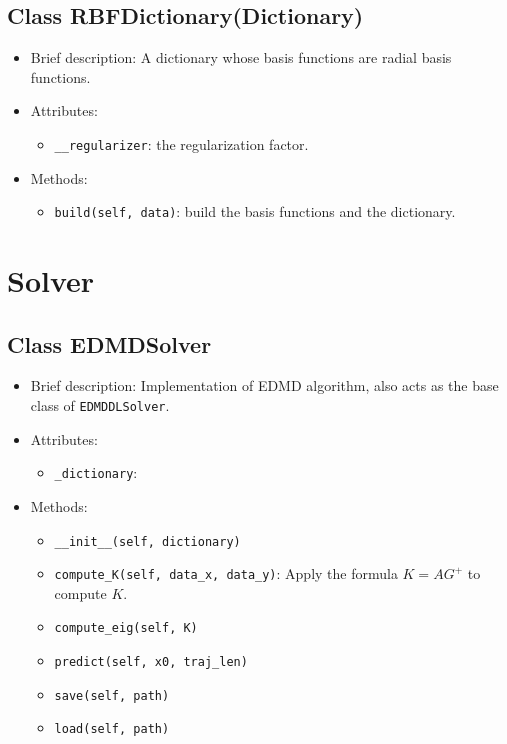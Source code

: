 \subsection{Class RBFDictionary(Dictionary)}

\begin{itemize}
\item Brief description: A dictionary whose basis functions are radial basis functions.
\item Attributes:
  \begin{itemize}
  \item \lstinline|__regularizer|: the regularization factor.
  \end{itemize}
\item Methods:
  \begin{itemize}
  \item \lstinline|build(self, data)|: build the basis functions and the dictionary.
  \end{itemize}
\end{itemize}

\section{Solver}

\subsection{Class EDMDSolver}

\begin{itemize}
\item Brief description: Implementation of EDMD algorithm,
  also acts as the base class of \lstinline|EDMDDLSolver|.
\item Attributes:
  \begin{itemize}
  \item \lstinline|_dictionary|: 
  \end{itemize}
\item Methods:
  \begin{itemize}
  \item \lstinline|__init__(self, dictionary)|
  \item \lstinline|compute_K(self, data_x, data_y)|:
    Apply the formula $K = AG^+$ to compute $K$.
  \item \lstinline|compute_eig(self, K)|
  \item \lstinline|predict(self, x0, traj_len)|
  \item \lstinline|save(self, path)|
  \item \lstinline|load(self, path)|
  \end{itemize}
\end{itemize}

